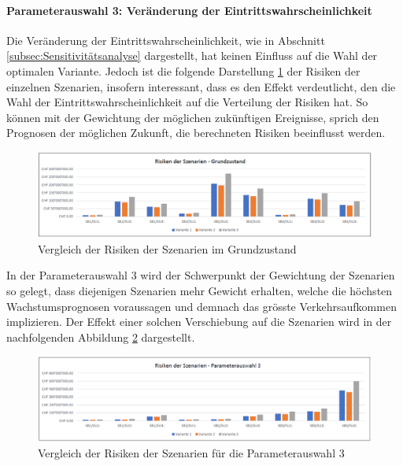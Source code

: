 \paragraph{Parameterauswahl 3: Veränderung der Eintrittswahrscheinlichkeit} 

Die Veränderung der Eintrittswahrscheinlichkeit, wie in Abschnitt \ref{subsec:Sensitivitätsanalyse} dargestellt, hat keinen Einfluss auf die Wahl der optimalen Variante. Jedoch ist die folgende Darstellung \ref{img:SzeVer-Z0} der Risiken der einzelnen Szenarien, insofern interessant, dass es den Effekt verdeutlicht, den die Wahl der Eintrittswahrscheinlichkeit auf die Verteilung der Risiken hat. So können mit der Gewichtung der möglichen zukünftigen Ereignisse, sprich den Prognosen der möglichen Zukunft, die berechneten Risiken beeinflusst werden. 

\begin{figure}[h!]
	\centering
	\includegraphics[width=\textwidth]{figures/f-06-04-RisikenSzenarienZ0}
	\caption[Szenarienvergleich im Grundzustand]{Vergleich der Risiken der Szenarien im Grundzustand}
	\label{img:SzeVer-Z0}
\end{figure} 

In der Parameterauswahl 3 wird der Schwerpunkt der Gewichtung der Szenarien so gelegt, dass diejenigen Szenarien mehr Gewicht erhalten, welche die höchsten Wachstumsprognosen voraussagen und demnach das grösste Verkehrsaufkommen implizieren. Der Effekt einer solchen Verschiebung auf die Szenarien wird in der nachfolgenden Abbildung \ref{img:SzeVer-Z3} dargestellt. 

\begin{figure}[h!]
	\centering
	\includegraphics[width=\textwidth]{figures/f-06-05-RisikenSzenarienZ3}
	\caption[Szenarienvergleich Parameterauswahl 3]{Vergleich der Risiken der Szenarien für die Parameterauswahl 3}
	\label{img:SzeVer-Z3}
\end{figure} 


